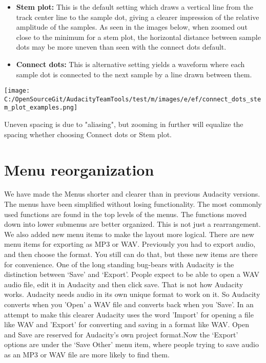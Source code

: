 \begin{multicols}{2}
\begin{itemize}
\item \textbf{Stem plot:} This is the default setting which draws a vertical line from the track center line to the sample dot, giving a clearer impression of the relative amplitude of the samples. As seen in the images below, when zoomed out close to the minimum for a stem plot, the horizontal distance between sample dots may be more uneven than seen with the connect dots default.   
\item \textbf{Connect dots:} This is alternative setting yields a waveform where each sample dot is connected to the next sample by a line drawn between them.  
\end{itemize}
\par \texttt{[image: C:/OpenSourceGit/AudacityTeamTools/test/m/images/e/ef/connect\_dots\_stem\_plot\_examples.png]}\par Uneven spacing is due to "aliasing", but zooming in further will equalize the spacing whether choosing Connect dots or Stem plot.
\section{Menu reorganization}We have made the Menus shorter and clearer than in previous Audacity versions. The menus have been simplified without losing functionality. The most commonly used functions are found in the top levels of the menus. The functions moved down into lower submenus are better organized.
This is not just a rearrangement.  We also added new menu items to make the layout more logical.  There are new menu items for exporting as MP3 or WAV. Previously you had to export audio, and then choose the format. You still can do that, but these new items are there for convenience.
One of the long standing bug-bears with Audacity is the distinction between ‘Save’ and ‘Export’. People expect to be able to open a WAV audio file, edit it in Audacity and then click save. That is not how Audacity works. Audacity needs audio in its own unique format to work on it. So Audacity converts when you 'Open' a WAV file and converts back when you 'Save'. In an attempt to make this clearer Audacity uses the word 'Import' for opening a file like WAV and 'Export' for converting and saving in a format like WAV. Open and Save are reserved for Audacity's own project format.Now the ‘Export’ options are under the ‘Save Other’ menu item, where people trying to save audio as an MP3 or WAV file are more likely to find them.

\end{multicols}
